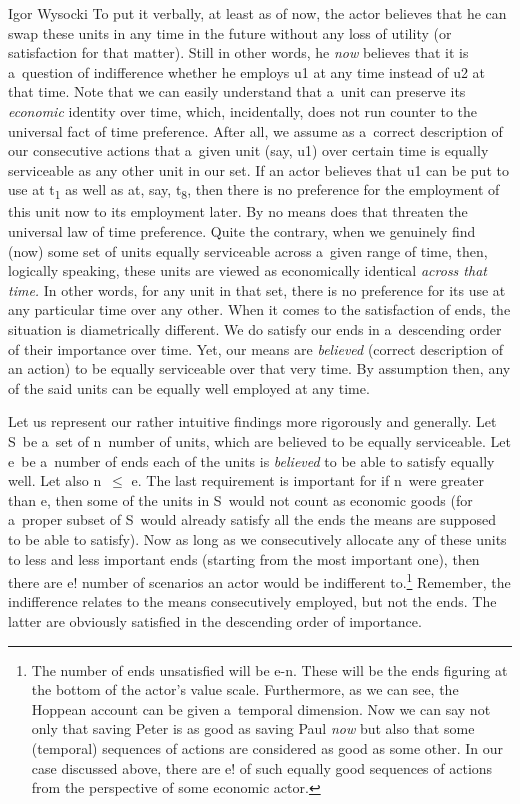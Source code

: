 \begin{artengenv}{Igor Wysocki}
To put it verbally, at least as of now, the actor believes that he can swap these units in any time in the future without any loss of utility (or satisfaction for that matter). Still in other words, he \textit{now} believes that it is a~question of indifference whether he employs u1 at any time instead of u2 at that time. Note that we can easily understand that a~unit can preserve its \textit{economic} identity over time, which, incidentally, does not run counter to the universal fact of time preference. After all, we assume as a~correct description of our consecutive actions that a~given unit (say, u1) over certain time is equally serviceable as any other unit in our set. If an actor believes that u1 can be put to use at t\textsubscript{1} as well as at, say, t\textsubscript{8}, then there is no preference for the employment of this unit now to its employment later. By no means does that threaten the universal law of time preference. Quite the contrary, when we genuinely find (now) some set of units equally serviceable across a~given range of time, then, logically speaking, these units are viewed as economically identical \textit{across that time.} In other words, for any unit in that set, there is no preference for its use at any particular time over any other. When it comes to the satisfaction of ends, the situation is diametrically different. We do satisfy our ends in a~descending order of their importance over time. Yet, our means are \textit{believed} (correct description of an action) to be equally serviceable over that very time. By assumption then, any of the said units can be equally well employed at any time.

Let us represent our rather intuitive findings more rigorously and generally. Let S~be a~set of n~number of units, which are believed to be equally serviceable. Let e~be a~number of ends each of the units is \textit{believed} to be able to satisfy equally well. Let also n~${\leq}$ e. The last requirement is important for if n~were greater than e, then some of the units in S~would not count as economic goods (for a~proper subset of S~would already satisfy all the ends the means are supposed to be able to satisfy). Now as long as we consecutively allocate any of these units to less and less important ends (starting from the most important one), then there are e! number of scenarios an actor would be indifferent to.\footnote{The number of ends unsatisfied will be e-n. These will be the ends figuring at the bottom of the actor's value scale. Furthermore, as we can see, the Hoppean account can be given a~temporal dimension. Now we can say not only that saving Peter is as good as saving Paul \textit{now} but also that some (temporal) sequences of actions are considered as good as some other. In our case discussed above, there are e! of such equally good sequences of actions from the perspective of some economic actor.} Remember, the indifference relates to the means consecutively employed, but not the ends. The latter are obviously satisfied in the descending order of importance.


\end{artengenv}
